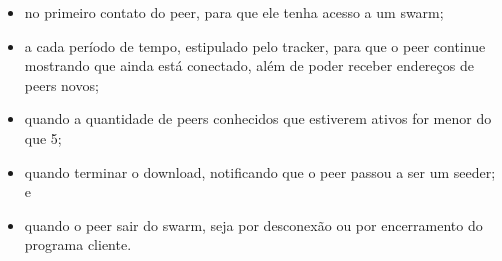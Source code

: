 \begin{itemize}
    \item no primeiro contato do \gls*{peer}, para que ele tenha acesso a um
        \gls*{swarm};

    \item a cada período de tempo, estipulado pelo tracker, para que o \gls*{peer}
        continue mostrando que ainda está conectado, além de poder receber endereços de
        \glspl*{peer} novos;

    \item quando a quantidade de \glspl*{peer} conhecidos que estiverem ativos for
        menor do que 5;

    \item quando terminar o download, notificando que o \gls*{peer} passou a ser um
        \gls*{seeder}; e

    \item quando o \gls*{peer} sair do \gls*{swarm}, seja por desconexão ou por
        encerramento do programa cliente.
\end{itemize}
